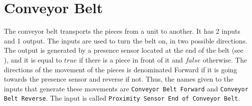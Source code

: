 
\section{Conveyor Belt}
\label{sec:magazine}
The conveyor belt transports the pieces from a
unit to another. It has 2 inputs and 1 output. The inputs are used to turn the
belt on, in two possible directions. The output is
generated by a presence sensor located at the end of the belt (see
), and it is equal to $true$ if there is a piece in front
of it and $false$ otherwise. The directions of the movement of the pieces is
denominated Forward if it is going towards the presence sensor and reverse if
not. Thus, the names given to the inputs that generate these movements are
\verb|Conveyor Belt Forward| and \verb|Conveyor Belt Reverse|.
The input is called \verb|Proximity Sensor End of Conveyor Belt|.

